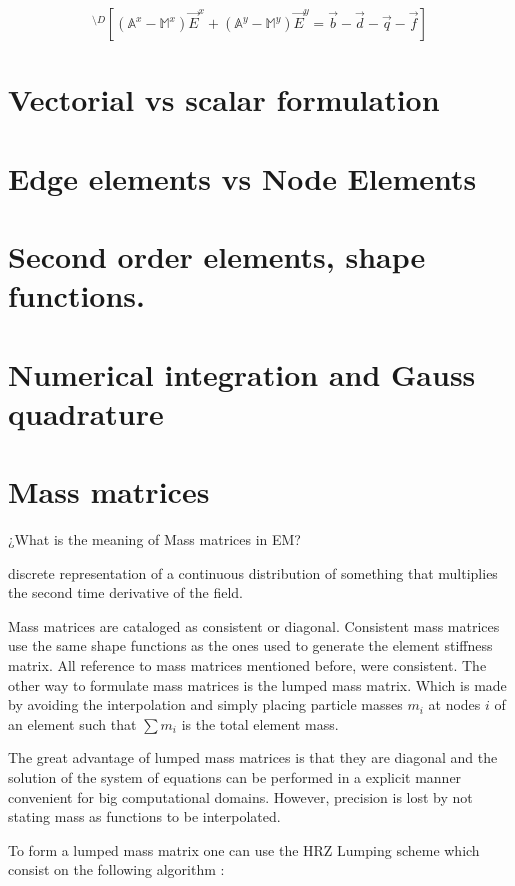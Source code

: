 \begin{equation*}
^{\setminus D}\left[\left(\mathbb{A}^x-\mathbb{M}^x\right)\vec{E}^x+
\left(\mathbb{A}^y-\mathbb{M}^y\right)\vec{E}^y= \vec{b}-\vec{d}-\vec{q}-\vec{f}\right]
\end{equation*}

\section{Vectorial vs scalar formulation}
\section{Edge elements vs Node Elements}
\section{Second order elements, shape functions.}


\section{Numerical integration and Gauss quadrature}



\section{Mass matrices}
¿What is the meaning of Mass matrices in EM?

discrete representation of a continuous distribution of something that multiplies the second time derivative of the field.

Mass matrices are cataloged as consistent or diagonal. Consistent mass matrices use the same shape functions as the ones used to generate the element stiffness matrix. All reference to mass matrices mentioned before, were consistent. \cite{RobertD.Cook1989}
The other way to formulate mass matrices is the lumped mass matrix. Which is made by avoiding the interpolation and simply placing particle masses $m_i$ at nodes $i$ of an element such that $\sum m_i$ is the total element mass. 

The great advantage of lumped mass matrices is that they are diagonal and the solution of the system of equations can be performed in a explicit manner convenient for big computational domains.
However, precision is lost by not stating mass as functions to be interpolated. 

To form a lumped mass matrix one can use the HRZ Lumping scheme 
which consist on the following algorithm \cite{RobertD.Cook1989}:

